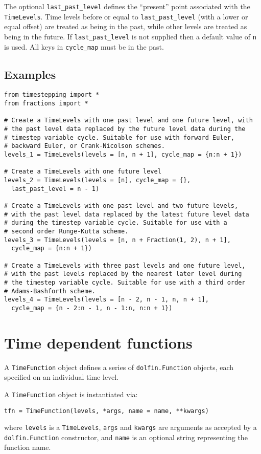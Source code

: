 \documentclass[a4paper]{book}
\begin{document}
The optional \verb+last_past_level+ defines the ``present'' point associated
with the \verb+TimeLevels+. Time levels before or equal to
\verb+last_past_level+ (with a lower or equal offset) are treated as being in
the past, while other levels are treated as being in the future. If
\verb+last_past_level+ is not supplied then a default value of \verb+n+ is used.
All keys in \verb+cycle_map+ must be in the past.

\subsection*{Examples}

\begin{lstlisting}
from timestepping import *
from fractions import *

# Create a TimeLevels with one past level and one future level, with
# the past level data replaced by the future level data during the
# timestep variable cycle. Suitable for use with forward Euler,
# backward Euler, or Crank-Nicolson schemes.
levels_1 = TimeLevels(levels = [n, n + 1], cycle_map = {n:n + 1})

# Create a TimeLevels with one future level
levels_2 = TimeLevels(levels = [n], cycle_map = {},
  last_past_level = n - 1)

# Create a TimeLevels with one past level and two future levels,
# with the past level data replaced by the latest future level data
# during the timestep variable cycle. Suitable for use with a
# second order Runge-Kutta scheme.
levels_3 = TimeLevels(levels = [n, n + Fraction(1, 2), n + 1],
  cycle_map = {n:n + 1})

# Create a TimeLevels with three past levels and one future level,
# with the past levels replaced by the nearest later level during
# the timestep variable cycle. Suitable for use with a third order
# Adams-Bashforth scheme.
levels_4 = TimeLevels(levels = [n - 2, n - 1, n, n + 1],
  cycle_map = {n - 2:n - 1, n - 1:n, n:n + 1})
\end{lstlisting}

\section{Time dependent functions}

A \verb+TimeFunction+ object defines a series of \verb+dolfin.Function+ objects,
each specified on an individual time level.

A \verb+TimeFunction+ object is instantiated via:
\begin{lstlisting}
tfn = TimeFunction(levels, *args, name = name, **kwargs)
\end{lstlisting}
where \verb+levels+ is a \verb+TimeLevels+, \verb+args+ and \verb+kwargs+ are
arguments as accepted by a \verb+dolfin.Function+ constructor, and \verb+name+
is an optional string representing the function name.
\end{document}
